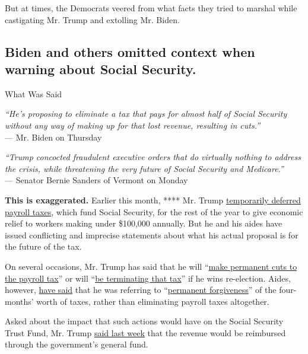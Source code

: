 But at times, the Democrats veered from what facts they tried to marshal
while castigating Mr. Trump and extolling Mr. Biden.

\hypertarget{biden-and-others-omitted-context-when-warning-about-social-security}{%
\subsection{Biden and others omitted context when warning about Social
Security.}\label{biden-and-others-omitted-context-when-warning-about-social-security}}

What Was Said

\emph{``He's proposing to eliminate a tax that pays for almost half of
Social Security without any way of making up for that lost revenue,
resulting in cuts.''}\\
--- Mr. Biden on Thursday

\emph{``Trump concocted fraudulent executive orders that do virtually
nothing to address the crisis, while threatening the very future of
Social Security and Medicare.''}\\
--- Senator Bernie Sanders of Vermont on Monday

\textbf{This is exaggerated.} Earlier this month, **** Mr. Trump
\href{https://www.whitehouse.gov/presidential-actions/memorandum-deferring-payroll-tax-obligations-light-ongoing-covid-19-disaster/}{temporarily
deferred payroll taxes}, which fund Social Security, for the rest of the
year to give economic relief to workers making under \$100,000 annually.
But he and his aides have issued conflicting and imprecise statements
about what his actual proposal is for the future of the tax.

On several occasions, Mr. Trump has said that he will
``\href{https://www.whitehouse.gov/briefings-statements/remarks-president-trump-press-briefing-080920/}{make
permanent cuts to the payroll tax}'' or will
``\href{https://www.whitehouse.gov/briefings-statements/remarks-president-trump-press-briefing-august-10-2020/}{be
terminating that tax}'' if he wins re-election. Aides, however,
\href{http://transcripts.cnn.com/TRANSCRIPTS/2008/09/sotu.01.html}{have
said} that he was referring to
``\href{https://www.whitehouse.gov/briefings-statements/press-briefing-press-secretary-kayleigh-mcenany-8-13-2020/}{permanent
forgiveness}'' of the four-months' worth of taxes, rather than
eliminating payroll taxes altogether.

Asked about the impact that such actions would have on the Social
Security Trust Fund, Mr. Trump
\href{https://www.whitehouse.gov/briefings-statements/remarks-president-trump-air-force-one-departure-morristown-nj-081020/}{said
last week} that the revenue would be reimbursed through the government's
general fund.

